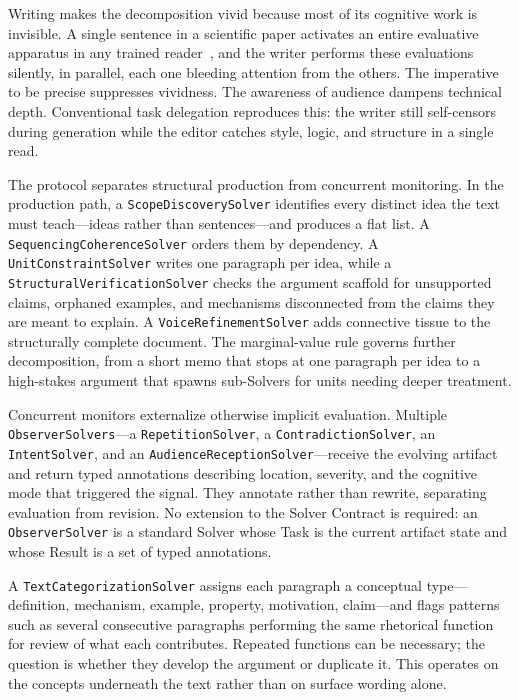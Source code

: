 \documentclass[11pt]{article}
\let\oldtexttt\texttt
\renewcommand{\texttt}[1]{\oldtexttt{\small #1}}
\begin{document}
Writing makes the decomposition vivid because most of its cognitive work is invisible. A single sentence in a scientific paper activates an entire evaluative apparatus in any trained reader~\cite{westerberg2026entangled}, and the writer performs these evaluations silently, in parallel, each one bleeding attention from the others. The imperative to be precise suppresses vividness. The awareness of audience dampens technical depth. Conventional task delegation reproduces this: the writer still self-censors during generation while the editor catches style, logic, and structure in a single read.

The protocol separates structural production from concurrent monitoring. In the production path, a \texttt{ScopeDiscoverySolver} identifies every distinct idea the text must teach---ideas rather than sentences---and produces a flat list. A \texttt{SequencingCoherenceSolver} orders them by dependency. A \texttt{UnitConstraintSolver} writes one paragraph per idea, while a \texttt{StructuralVerificationSolver} checks the argument scaffold for unsupported claims, orphaned examples, and mechanisms disconnected from the claims they are meant to explain. A \texttt{VoiceRefinementSolver} adds connective tissue to the structurally complete document. The marginal-value rule governs further decomposition, from a short memo that stops at one paragraph per idea to a high-stakes argument that spawns sub-Solvers for units needing deeper treatment.

Concurrent monitors externalize otherwise implicit evaluation. Multiple \texttt{ObserverSolvers}---a \texttt{RepetitionSolver}, a \texttt{ContradictionSolver}, an \texttt{IntentSolver}, and an \texttt{AudienceReceptionSolver}---receive the evolving artifact and return typed annotations describing location, severity, and the cognitive mode that triggered the signal. They annotate rather than rewrite, separating evaluation from revision. No extension to the Solver Contract is required: an \texttt{ObserverSolver} is a standard Solver whose Task is the current artifact state and whose Result is a set of typed annotations.

A \texttt{TextCategorizationSolver} assigns each paragraph a conceptual type---definition, mechanism, example, property, motivation, claim---and flags patterns such as several consecutive paragraphs performing the same rhetorical function for review of what each contributes. Repeated functions can be necessary; the question is whether they develop the argument or duplicate it. This operates on the concepts underneath the text rather than on surface wording alone.
\end{document}
